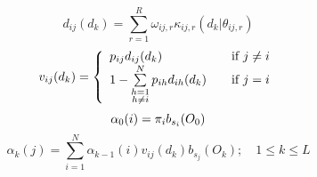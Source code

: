 \documentclass[12pt]{article} %
\begin{document}
\begin{equation}
    d_{ij}(d_k) = \sum_{r=1}^{R} \omega_{ij,r}\kappa_{ij,r}(d_k|\theta_{ij, r})
\end{equation}
\begin{equation}
    v_{ij}(d_k) = \left\{
        \begin{array}{l l}
            p_{ij} d_{ij}(d_k)
                & \quad \text{if $j \neq i$}\\
            1 - \sum\limits_{\substack{h=1 \\ h \neq i}}^{N} p_{ih} d_{ih}(d_k)
                & \quad \text{if $j = i$}
        \end{array} \right.
\end{equation}
\begin{equation}
    \alpha_0(i) = \pi_{i}b_{s_i}(O_0) \\
\end{equation}
\begin{equation}
    \alpha_k(j) = \sum_{i=1}^{N} \alpha_{k-1}(i) v_{ij}(d_k) b_{s_j}(O_k);
    \quad 1 \leq k \leq L
\end{equation}
\end{document}
